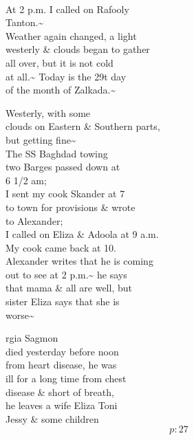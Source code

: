 \documentclass{report}
\begin{document}


	\par{
 	\ \\At 2 p.m. I called on Rafooly\ \\Tanton.\~{}\ \\Weather again changed, a light\ \\westerly \& clouds began to gather\ \\all over, but it is not cold\ \\at all.\~{} Today is the 29t day\ \\of the month of Zalkada.\~{}\ \\
	}


	\par{
 	Westerly, with some\ \\clouds on Eastern \& Southern parts,\ \\but getting fine\~{}\ \\The SS Baghdad towing\ \\two Barges passed down at\ \\6 1/2 am;\ \\I sent my cook Skander at 7\ \\to town for provisions \& wrote\ \\to Alexander;\ \\I called on Eliza \& Adoola at 9 a.m.\ \\My cook came back at 10.\ \\Alexander writes that he is coming\ \\out to see at 2 p.m.\~{} he says\ \\that mama \& all are well, but\ \\sister Eliza says that she is\ \\worse\~{}\ \\
	}

	\par{
 	rgia Sagmon\ \\died yesterday before noon\ \\from heart disease, he was\ \\ill for a long time from chest\ \\disease \& short of breath,\ \\he leaves a wife Eliza Toni\ \\Jessy \& some children\ \\
  \[p: 27 \]

	}
\end{document}

